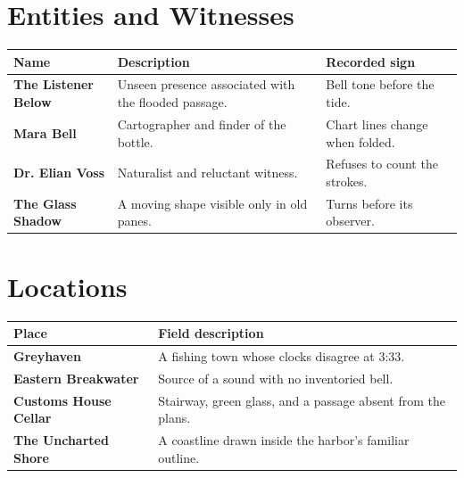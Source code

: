 \section*{Entities and Witnesses}
\begin{tabularx}{\textwidth}{>{\bfseries}p{} X X}
\toprule
Name & Description & Recorded sign \\
\midrule
The Listener Below & Unseen presence associated with the flooded passage. & Bell tone before the tide. \\
Mara Bell & Cartographer and finder of the bottle. & Chart lines change when folded. \\
Dr. Elian Voss & Naturalist and reluctant witness. & Refuses to count the strokes. \\
The Glass Shadow & A moving shape visible only in old panes. & Turns before its observer. \\
\bottomrule
\end{tabularx}

\section*{Locations}
\begin{tabularx}{\textwidth}{>{\bfseries}p{} X}
\toprule
Place & Field description \\
\midrule
Greyhaven & A fishing town whose clocks disagree at 3:33. \\
Eastern Breakwater & Source of a sound with no inventoried bell. \\
Customs House Cellar & Stairway, green glass, and a passage absent from the plans. \\
The Uncharted Shore & A coastline drawn inside the harbor's familiar outline. \\
\bottomrule
\end{tabularx}

